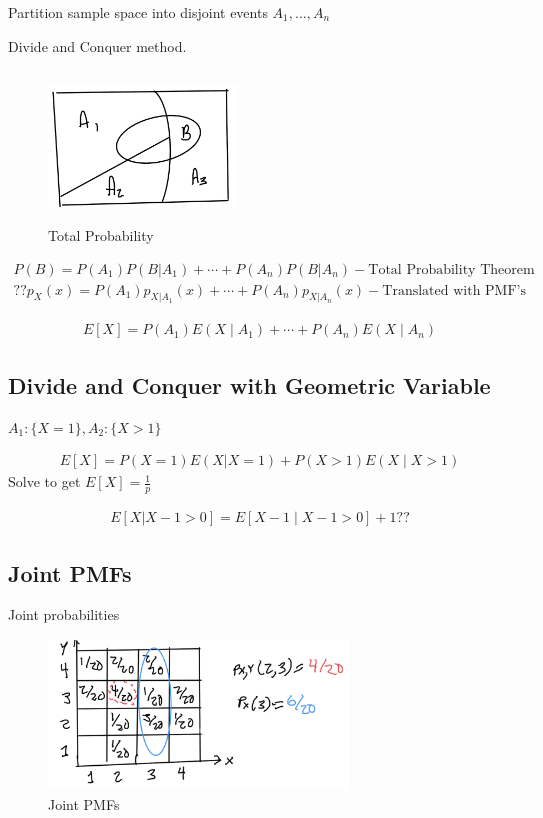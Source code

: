 
Partition sample space into disjoint events $A_1, \ldots, A_n$

Divide and Conquer method.

\begin{figure}[ht]
\centering
\includegraphics[width=5cm, height=4cm]{images/L02/total_prob.jpeg}
\caption{Total Probability}
\end{figure}

\begin{align}
P(B)=P(A_1)P(B|A_1) + \cdots + P(A_n)P(B|A_n) - \text{Total Probability Theorem} \\
?? p_X(x) = P(A_1)p_{X|A_1}(x) + \cdots + P(A_n)p_{X|A_n}(x) - \text{Translated with PMF's}
\end{align}

\begin{align*}
E[X]=P(A_1)E(X \mid A_1) + \cdots + P(A_n)E(X \mid A_n)
\end{align*}

\subsection{Divide and Conquer with Geometric Variable}


$A_1:\{X=1\}, A_2:\{X >1\}$

\begin{align*}
E[X]=P(X=1)E(X|X=1) + P(X > 1)E(X \mid X>1)
\end{align*}
Solve to get $E[X]=\frac{1}{p}$

\begin{align*}
E[X|X-1 >0] = E[X-1 \mid X-1>0] + 1 ??
\end{align*}

\subsection{Joint PMFs}

 Joint probabilities

\begin{figure}[ht]
\centering
\includegraphics[width=8cm, height=4cm]{images/L06/joint_pmf.jpeg}
\caption{Joint PMFs}
\end{figure}
